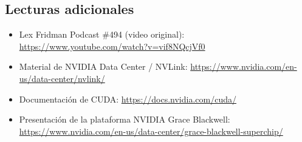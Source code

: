 \documentclass[a4paper]{article}
\begin{document}
\subsection{Lecturas adicionales}

\begin{itemize}
    \item Lex Fridman Podcast \#494 (video original): \url{https://www.youtube.com/watch?v=vif8NQcjVf0}
    \item Material de NVIDIA Data Center / NVLink: \url{https://www.nvidia.com/en-us/data-center/nvlink/}
    \item Documentación de CUDA: \url{https://docs.nvidia.com/cuda/}
    \item Presentación de la plataforma NVIDIA Grace Blackwell: \url{https://www.nvidia.com/en-us/data-center/grace-blackwell-superchip/}
\end{itemize}

\end{document}
